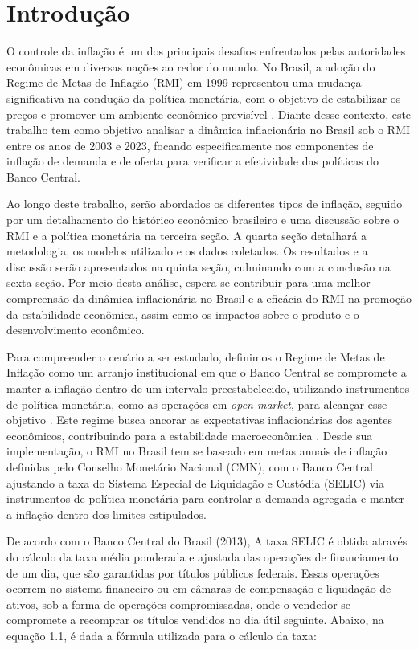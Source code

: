 \documentclass[12pt,oneside,a4paper,chapter=TITLE,english,brazil,sumario=abnt-6027-2012]{abntex2}
\begin{document}
\chapter{Introdução}

O controle da inflação é um dos principais desafios enfrentados pelas autoridades econômicas em diversas nações ao redor do mundo. No Brasil, a adoção do Regime de Metas de Inflação (RMI) em 1999 representou uma mudança significativa na condução da política monetária, com o objetivo de estabilizar os preços e promover um ambiente econômico previsível \cite{fraga_2003_inflation}. Diante desse contexto, este trabalho tem como objetivo analisar a dinâmica inflacionária no Brasil sob o RMI entre os anos de 2003 e 2023, focando especificamente nos componentes de inflação de demanda e de oferta para verificar a efetividade das políticas do Banco Central.

Ao longo deste trabalho, serão abordados os diferentes tipos de inflação, seguido por um detalhamento do histórico econômico brasileiro e uma discussão sobre o RMI e a política monetária na terceira seção. A quarta seção detalhará a metodologia, os modelos utilizado e os dados coletados. Os resultados e a discussão serão apresentados na quinta seção, culminando com a conclusão na sexta seção. Por meio desta análise, espera-se contribuir para uma melhor compreensão da dinâmica inflacionária no Brasil e a eficácia do RMI na promoção da estabilidade econômica, assim como os impactos sobre o produto e o desenvolvimento econômico.

Para compreender o cenário a ser estudado, definimos o Regime de Metas de Inflação como um arranjo institucional em que o Banco Central se compromete a manter a inflação dentro de um intervalo preestabelecido, utilizando instrumentos de política monetária, como as operações em \textit{open market}, para alcançar esse objetivo \cite{svensson_1997_inflation}. Este regime busca ancorar as expectativas inflacionárias dos agentes econômicos, contribuindo para a estabilidade macroeconômica \cite{mishkin_2000_inflation}. Desde sua implementação, o RMI no Brasil tem se baseado em metas anuais de inflação definidas pelo Conselho Monetário Nacional (CMN), com o Banco Central ajustando a taxa do Sistema Especial de Liquidação e Custódia (SELIC) via instrumentos de política monetária para controlar a demanda agregada e manter a inflação dentro dos limites estipulados.

De acordo com o Banco Central do Brasil (2013), A taxa SELIC é obtida através do cálculo da taxa média ponderada e ajustada das operações de financiamento de um dia, que são garantidas por títulos públicos federais. Essas operações ocorrem no sistema financeiro ou em câmaras de compensação e liquidação de ativos, sob a forma de operações compromissadas, onde o vendedor se compromete a recomprar os títulos vendidos no dia útil seguinte. Abaixo, na equação 1.1, é dada a fórmula utilizada para o cálculo da taxa:
\end{document}
